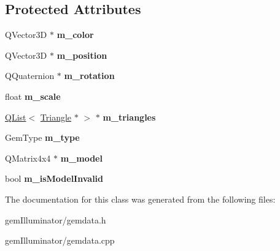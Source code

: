 \subsection*{Protected Attributes}
\begin{DoxyCompactItemize}
\item 
\hypertarget{class_gem_data_aa5888d4d3212ba621643a0f1c1efca76}{}Q\+Vector3\+D $\ast$ {\bfseries m\+\_\+color}\label{class_gem_data_aa5888d4d3212ba621643a0f1c1efca76}

\item 
\hypertarget{class_gem_data_ad5c2bc9fc38c168fbbf143e0092c8cdb}{}Q\+Vector3\+D $\ast$ {\bfseries m\+\_\+position}\label{class_gem_data_ad5c2bc9fc38c168fbbf143e0092c8cdb}

\item 
\hypertarget{class_gem_data_a8a055b766496fa47842a683035f15637}{}Q\+Quaternion $\ast$ {\bfseries m\+\_\+rotation}\label{class_gem_data_a8a055b766496fa47842a683035f15637}

\item 
\hypertarget{class_gem_data_a15953642fe15a2a37aceea037e4ad81e}{}float {\bfseries m\+\_\+scale}\label{class_gem_data_a15953642fe15a2a37aceea037e4ad81e}

\item 
\hypertarget{class_gem_data_a21068b04db70d2e37e9c30d816484f25}{}\hyperlink{class_q_list}{Q\+List}$<$ \hyperlink{class_triangle}{Triangle} $\ast$ $>$ $\ast$ {\bfseries m\+\_\+triangles}\label{class_gem_data_a21068b04db70d2e37e9c30d816484f25}

\item 
\hypertarget{class_gem_data_a310940114f54b2146f6601662e8a323f}{}Gem\+Type {\bfseries m\+\_\+type}\label{class_gem_data_a310940114f54b2146f6601662e8a323f}

\item 
\hypertarget{class_gem_data_a3a7eec529b0228a410ea608401cf2f1a}{}Q\+Matrix4x4 $\ast$ {\bfseries m\+\_\+model}\label{class_gem_data_a3a7eec529b0228a410ea608401cf2f1a}

\item 
\hypertarget{class_gem_data_a82ba26b9a691149c8525244969cceaef}{}bool {\bfseries m\+\_\+is\+Model\+Invalid}\label{class_gem_data_a82ba26b9a691149c8525244969cceaef}

\end{DoxyCompactItemize}


The documentation for this class was generated from the following files\+:\begin{DoxyCompactItemize}
\item 
gem\+Illuminator/gemdata.\+h\item 
gem\+Illuminator/gemdata.\+cpp\end{DoxyCompactItemize}
